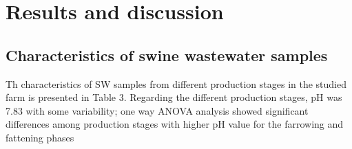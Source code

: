 \section{Results and discussion}
\subsection{Characteristics of swine wastewater samples}
Th characteristics of SW samples from different production stages in the studied farm is presented in Table 3. Regarding the different production stages, pH was 7.83 with some variability; one way ANOVA analysis showed significant differences among production stages with higher pH value for the farrowing and fattening phases